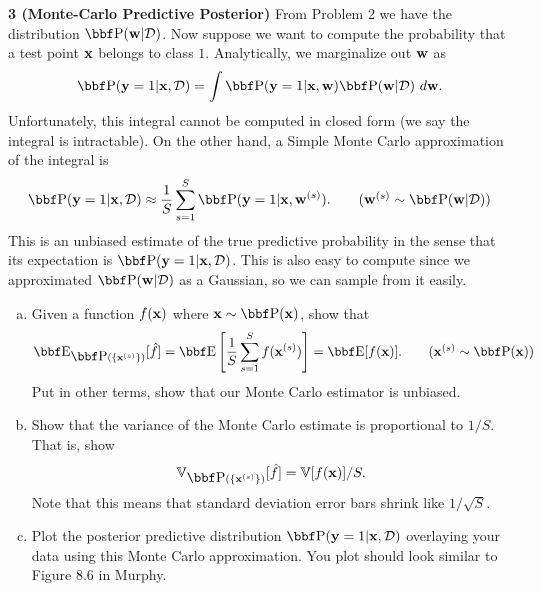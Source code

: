 \documentclass[12pt,letterpaper,fleqn]{hmcpset}
\begin{document}
\textbf{3 (Monte-Carlo Predictive Posterior)} From Problem 2 we have the distribution
$\PP(\ww|\Dc)$. Now suppose we want to compute the probability that a test point ${\bf x}$
belongs to class $1$. Analytically, we marginalize out ${\bf w}$ as
\[
    \PP(\yy=1|\xx,\Dc) = \int \PP(\yy=1|\xx,\ww)\PP(\ww|\Dc)~d\ww.
\]
Unfortunately, this integral cannot be computed in closed form (we say the integral is
intractable). On the other hand, a Simple Monte Carlo approximation of the integral is
\begin{align*}
    \PP(\yy=1|\xx,\Dc) \approx \frac{1}{S}\sum_{s=1}^S \PP(\yy=1|\xx,\ww^{(s)}).\tag{$\ww^{(s)}\sim\PP(\ww|\Dc)$}
\end{align*}
This is an unbiased estimate of the true predictive probability in the sense that its expectation
is $\PP(\yy=1|\xx,\Dc)$. This is also easy to compute since we approximated $\PP(\ww|\Dc)$ as
a Gaussian, so we can sample from it easily.
\begin{enumerate}[(a)]
    \item Given a function $f({\bf x})$ where $\xx\sim \PP(\xx)$, show that
        \begin{align*}
            \EE_{\PP(\{\xx^{(s)}\})}[\hat f] = \EE\left[\frac{1}{S}\sum_{s=1}^S f(\xx^{(s)})\right] = \EE[f(\xx)].\tag{$\xx^{(s)}\sim\PP(\xx)$}
        \end{align*}
        Put in other terms, show that our Monte Carlo estimator is unbiased.
    \item Show that the variance of the Monte Carlo estimate is proportional to
        $1/S$. That is, show
        \begin{align*}
            \mathbb{V}_{\PP(\{\xx^{(s)}\})}[\hat f] = \mathbb{V}[f(\xx)]/S.
        \end{align*}
        Note that this means that standard deviation error bars shrink like $1/\sqrt{S}$.
    \item Plot the posterior predictive distribution $\PP(\yy=1|\xx,\Dc)$ overlaying your data
        using this Monte Carlo approximation. You plot should look similar to Figure 8.6 in
        Murphy.
\end{enumerate}
\end{document}
